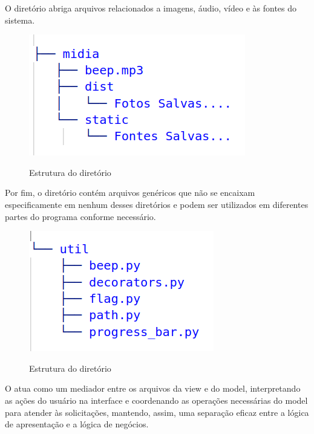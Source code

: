 O diretório  abriga arquivos relacionados a imagens, áudio, vídeo e às fontes do sistema.

\begin{figure}[H]
	\centering
	\caption{Estrutura do diretório }
	\includegraphics[scale=0.5]{figuras/diretorios/midia.png}
	\label{fig:midia}
\end{figure}

Por fim, o diretório  contém arquivos genéricos que não se encaixam especificamente em nenhum desses diretórios e podem ser utilizados em diferentes partes do programa conforme necessário.

\begin{figure}[H]
	\centering
    \caption{Estrutura do diretório }
	\includegraphics[scale=0.5]{figuras/diretorios/util.png}
	\label{fig:util}
\end{figure}

O  atua como um mediador entre os arquivos da view e do model, interpretando as ações do usuário na interface e coordenando as operações necessárias do model para atender às solicitações, mantendo, assim, uma separação eficaz entre a lógica de apresentação e a lógica de negócios.

